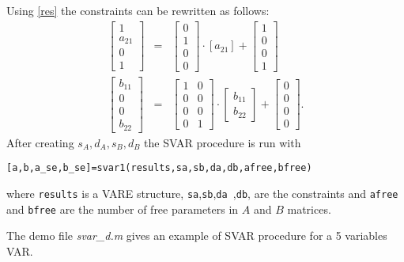 \documentclass{article}
\begin{document}
Using \ref{res} the constraints can be rewritten as follows:
\begin{eqnarray}
\left[
\begin{array}{c}
1 \\
a_{21} \\
0 \\
1
\end{array}
\right]  &=&\left[
\begin{array}{c}
0 \\
1 \\
0 \\
0
\end{array}
\right] \cdot \left[ a_{21}\right] +\left[
\begin{array}{c}
1 \\
0 \\
0 \\
1
\end{array}
\right]  \\
\left[
\begin{array}{c}
b_{11} \\
0 \\
0 \\
b_{22}
\end{array}
\right]  &=&\left[
\begin{array}{cc}
1 & 0 \\
0 & 0 \\
0 & 0 \\
0 & 1
\end{array}
\right] \cdot \left[
\begin{array}{c}
b_{11} \\
b_{22}
\end{array}
\right] +\left[
\begin{array}{c}
0 \\
0 \\
0 \\
0
\end{array}
\right] .
\end{eqnarray}
After creating $s_{A},d_{A},s_{B},d_{B}$ the SVAR procedure is run with
\begin{verbatim}
[a,b,a_se,b_se]=svar1(results,sa,sb,da,db,afree,bfree)
\end{verbatim}

\noindent
where \texttt{results} is a VARE structure, \texttt{sa},\texttt{sb},\texttt{da%
},\texttt{db}, are the constraints and \texttt{afree} and \texttt{bfree} are
the number of free parameters in $A$ and $B$ matrices.

The demo file \textit{svar\_d.m} gives an example of SVAR procedure for a 5
variables VAR.
\end{document}
